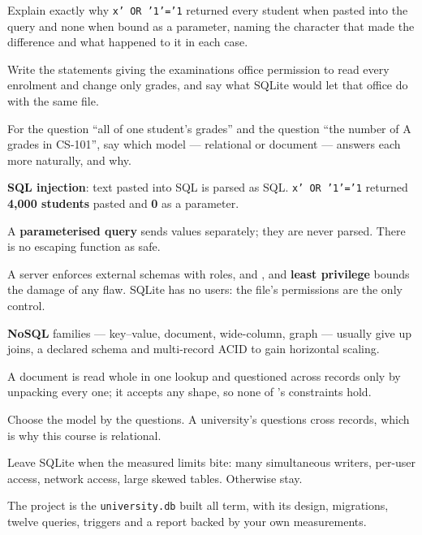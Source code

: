 \begin{checkpoint}
\begin{tightnum}
  \item Explain exactly why \texttt{x' OR '1'='1} returned every student when
        pasted into the query and none when bound as a parameter, naming the
        character that made the difference and what happened to it in each
        case.
  \item Write the  statements giving the examinations office
        permission to read every enrolment and change only grades, and say
        what SQLite would let that office do with the same file.
  \item For the question ``all of one student's grades'' and the question
        ``the number of A grades in CS-101'', say which model --- relational or
        document --- answers each more naturally, and why.
\end{tightnum}
\end{checkpoint}

\begin{chaptersummary}
\begin{tight}
  \item \textbf{SQL injection}: text pasted into SQL is parsed as SQL.
        \texttt{x' OR '1'='1} returned \textbf{4{,}000 students} pasted and
        \textbf{0} as a parameter.
  \item A \textbf{parameterised query} sends values separately; they are never
        parsed. There is no escaping function as safe.
  \item A server enforces external schemas with roles,  and
        , and \textbf{least privilege} bounds the damage of any
        flaw. SQLite has no users: the file's permissions are the only
        control.
  \item \textbf{NoSQL} families --- key--value, document, wide-column, graph
        --- usually give up joins, a declared schema and multi-record ACID to
        gain horizontal scaling.
  \item A document is read whole in one lookup and questioned across records
        only by unpacking every one; it accepts any shape, so none of
        's constraints hold.
  \item Choose the model by the questions. A university's questions cross
        records, which is why this course is relational.
  \item Leave SQLite when the measured limits bite: many simultaneous writers,
        per-user access, network access, large skewed tables. Otherwise stay.
  \item The project is the \texttt{university.db} built all term, with its
        design, migrations, twelve queries, triggers and a report backed by
        your own measurements.
\end{tight}
\end{chaptersummary}

